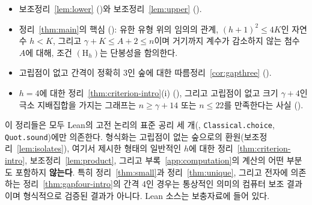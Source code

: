\documentclass[11pt,a4paper]{article}
\theoremstyle{definition}
\begin{document}
\begin{itemize}
\item 보조정리~\ref{lem:lower}
()와 보조정리~\ref{lem:upper}
().
\item 정리~\ref{thm:main}의 핵심
(): 유한 유형 위의 임의의 관계, $(h+1)^2\le4K$인
자연수 $h<K$, 그리고 $\gamma+K\le A+2\le n$이며 거기까지 계수가 감소하지 않는 첨수
$A$에 대해, 조건 $(\mathrm{H}_h)$는 단봉성을 함의한다.
\item 고립점이 없고 간격이 정확히 3인 숲에 대한 따름정리~\ref{cor:gapthree}
().
\item $h=4$에 대한 정리~\ref{thm:criterion-intro}(i)
(), 그리고 고립점이 없고 크기 $\gamma+4$인 극소
지배집합을 가지는 그래프는 $n\ge\gamma+14$ 또는 $n\le22$를 만족한다는 사실
().
\end{itemize}

이 정리들은 모두 Lean의 고전 논리의 표준 공리 세 개(,
\texttt{Classical.choice}, \texttt{Quot.sound})에만 의존한다. 형식화는 고립점이 없는
숲으로의 환원(보조정리~\ref{lem:isolates}), 여기서 제시한 형태의 일반적인 $h$에 대한
정리~\ref{thm:criterion-intro}, 보조정리~\ref{lem:product}, 그리고
부록~\ref{app:computation}의 계산의 어떤 부분도 포함하지 \textbf{않는다}. 특히
정리~\ref{thm:small}과 정리~\ref{thm:unique}, 그리고 전자에 의존하는
정리~\ref{thm:gapfour-intro}의 간격 4인 경우는 통상적인 의미의 컴퓨터 보조 결과이며
형식적으로 검증된 결과가 아니다. Lean 소스는 보충자료에 들어 있다.
\end{document}

